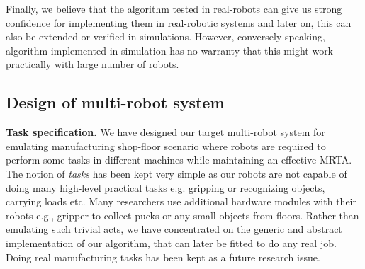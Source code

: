 Finally, we believe that the algorithm tested in real-robots can give us strong confidence for implementing them in real-robotic systems and later on, this can also be extended or verified in simulations. However, conversely speaking, algorithm implemented in simulation has no warranty that this might work practically with large number of robots.
\subsection{Design of multi-robot system}
\label{expt-tools:mrs-design}
\textbf{Task specification.} We have designed our target multi-robot system for emulating manufacturing shop-floor scenario where robots are required to perform some tasks in different machines while maintaining an effective MRTA. The notion of {\em tasks} has been kept very simple as our robots are not capable of doing many high-level practical tasks e.g. gripping or recognizing objects, carrying loads etc. Many researchers use additional hardware modules with their robots e.g., gripper to collect pucks or any small objects from floors. Rather than emulating such trivial acts, we have  concentrated on the generic and abstract implementation of our algorithm, that can later be fitted to do any real job. Doing real manufacturing tasks has been kept as a future research issue.

